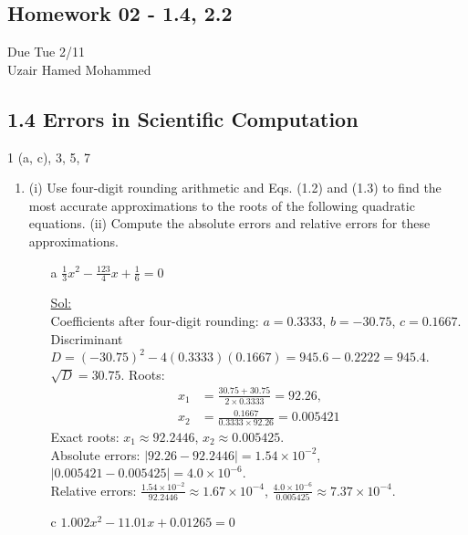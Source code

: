 \begin{center}
  \section*{Homework 02 - 1.4, 2.2}
  Due Tue 2/11 \\
  Uzair Hamed Mohammed
\end{center}

\subsection*{1.4 Errors in Scientific Computation}

1 (a, c), 3, 5, 7

\begin{enumerate}
  \item (i) Use four-digit rounding arithmetic and Eqs. (1.2) and
    (1.3) to find the most accurate approximations to the roots of
    the following quadratic equations. (ii) Compute the absolute
    errors and relative errors for these approximations.
    \begin{itemize}
      \item[a] \( \frac{1}{3}x^2 - \frac{123}{4}x + \frac{1}{6} = 0\)

        \underline{Sol:} \\
        Coefficients after four-digit rounding: \( a = 0.3333 \), \(
        b = -30.75 \), \( c = 0.1667 \).
        Discriminant \( D = (-30.75)^2 - 4(0.3333)(0.1667) = 945.6 -
        0.2222 = 945.4 \).
        \( \sqrt{D} = 30.75 \).
        Roots:
        \[
          \begin{aligned}
            x_1 &= \frac{30.75 + 30.75}{2 \times 0.3333} = 92.26, \\
            x_2 &= \frac{0.1667}{0.3333 \times 92.26} = 0.005421
          \end{aligned}
        \]
        Exact roots: \( x_1 \approx 92.2446 \), \( x_2 \approx 0.005425 \).  \\
        Absolute errors: \( |92.26 - 92.2446| = 1.54 \times 10^{-2}
        \), \( |0.005421 - 0.005425| = 4.0 \times 10^{-6} \).  \\
        Relative errors: \( \frac{1.54 \times 10^{-2}}{92.2446}
        \approx 1.67 \times 10^{-4} \), \( \frac{4.0 \times
        10^{-6}}{0.005425} \approx 7.37 \times 10^{-4} \).

        \bigbreak

      \item[c] \( 1.002x^2 - 11.01x + 0.01265 = 0 \)


\end{itemize}
\end{enumerate}
